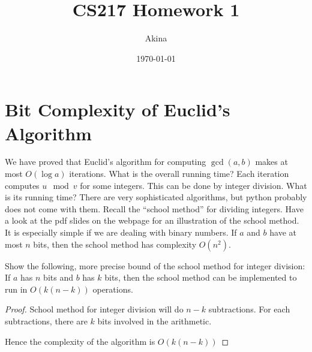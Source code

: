 \documentclass[11pt,a4paper,oneside]{article}
\renewcommand{\hwtitle} {CS217 Homework 1}
\renewcommand{\hwauthor}{Akina}
\renewcommand{\hwdate}{\today}
\begin{document}
\title{\hwtitle}
\author{\hwauthor}
\date{\hwdate}
\maketitle

\section*{Bit Complexity of Euclid's Algorithm}
We have proved that Euclid's algorithm for computing $\gcd(a,b)$ makes at most
$O(\log a)$ iterations. What is the overall running time? Each iteration computes
$u \mod v$ for some integers. This can be done by integer division. What is its running time?
There are very sophisticated algorithms, but python probably does not come with them. 
Recall the ``school method'' for dividing integers. Have a look at the pdf slides on the 
webpage for an illustration of the school method. It is especially simple if we are dealing
with binary numbers. If $a$ and $b$ have at most $n$ bits, then the school method 
has complexity $O(n^2)$.

\begin{problem}{1}
	\statement
	Show the following, more precise bound of the school method for integer division:
	If $a$ has $n$ bits and $b$ has $k$ bits, then the school method can be implemented
	to run in $O( k(n-k))$ operations.
	\solution
	\begin{proof}
	School method for integer division will do \( n - k \) subtractions. For each subtractions, there are  \( k \) bits involved in the arithmetic.
		
	Hence the complexity of the algorithm is \( O(k(n - k))\)

	\end{proof}
\end{problem}
\end{document}
